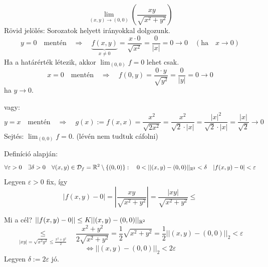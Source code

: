 \documentclass[a4paper,11.5pt]{article}
\begin{document}
	\begin{task}
		\[ \lim_{(x,y)\to(0,0)}\left(\frac{xy}{\sqrt{x^2+y^2}}\right) \]
		Rövid jelölés: Sorozatok helyett irányokkal dolgozunk.
		\[ y=0\quad \text{mentén}\quad \Rightarrow\quad \underbrace{f(x,y)}_{x\not=0}=\frac{x\cdot0}{\sqrt{x^2}}=\frac{0}{|x|}=0\to0\quad (\text{ha}\quad x\to0) \]
		Ha a határérték létezik, akkor $\lim_{(0,0)}f=0$ lehet csak.
		\[ x=0\quad \text{mentén}\quad \Rightarrow\quad f(0,y)=\frac{0\cdot y}{\sqrt{y^2}}=\frac{0}{|y|}=0\to 0 \]
		ha $y\to0$.
		
		\smallskip
		vagy:
		\[ y=x\quad \text{mentén}\quad \Rightarrow\quad g(x):=f(x,x)=\frac{x^2}{\sqrt{2x^2}}=\frac{x^2}{\sqrt{2}\cdot|x|}=\frac{|x|^2}{\sqrt{2}\cdot|x|}=\frac{|x|}{\sqrt{2}}\to0 \]
		Sejtés: $\lim_{(0,0)}f=0$. (lévén nem tudtuk cáfolni)
		
		Definíció alapján:
		\[ \forall\varepsilon>0\quad \exists\delta>0\quad \forall(x,y)\in\mathcal{D}_f=\R^2\setminus\{(0,0)\}:\quad 0<||(x,y)-(0,0)||_{\R^2}<\delta\quad |f(x,y)-0|<\varepsilon \]
		Legyen $\varepsilon>0$ fix, így \[|f(x,y)-0|=\left|\frac{xy}{\sqrt{x^2+y^2}}\right|=\frac{|xy|}{\sqrt{x^2+y^2}}\leq \]
		
		Mi a cél? $||f(x,y)-0||\leq K||(x,y)-(0,0)||_{\mathbb{R}{^2}}$
		\[ \underset{|xy|=\sqrt{x^2y^2}\leq\frac{x^2+y^2}{2}}{\leq}\quad\frac{x^2+y^2}{2\sqrt{x^2+y^2}}=\frac{1}{2}\sqrt{x^2+y^2}=\frac{1}{2}||(x,y)-(0,0)||_2<\varepsilon  \]
		\[ \Leftrightarrow||(x,y)-(0,0)||_2<2\varepsilon \]
		Legyen $\delta:=2\varepsilon$ jó.
	\end{task}
\end{document}
